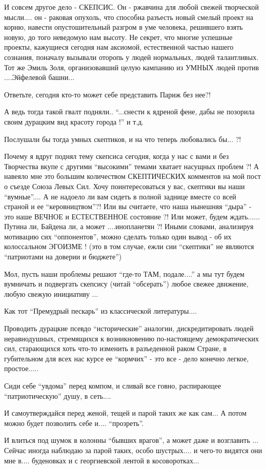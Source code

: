 И совсем другое дело - СКЕПСИС. Он - ржавчина для любой свежей творческой
мысли.... он - раковая опухоль, что способна разъесть новый смелый проект на
корню, навести опустошительный разгром в уме человека, решившего взять новую,
до того неведомую нам высоту. Не секрет, что многие успешные проекты, кажущиеся
сегодня нам аксиомой, естественной частью нашего сознания, поначалу вызывали
оторопь у людей нормальных, людей талантливых. Тот же Эмиль Золя,
организовавший целую кампанию из УМНЫХ людей против ....Эйфелевой башни... 

Ответьте, сегодня кто-то может себе представить Париж без нее?! 

А ведь тогда такой гвалт подняли.. \enquote{...снести к ядреной фене, дабы не позорила
своим дурацким вид красоту города !}
и т.д. 

Послушали бы тогда умных скептиков, и на что теперь любовались бы... ?!

Почему я вдруг поднял тему скепсиса сегодня, когда у нас с вами и без
Творчества вкупе с другими \enquote{высокими} темами хватает насущных проблем ?! А
навеяло мне это большим количеством СКЕПТИЧЕСКИХ комментов на мой пост о съезде
Союза Левых Сил. Хочу поинтересоваться у вас, скептики вы наши \enquote{вумные}.... А
не надоело ли вам сидеть в полной заднице вместе со всей страной и ее
\enquote{керовництвом}?! Или вы считаете, что наша нынешняя \enquote{дыра} - это наше ВЕЧНОЕ и
ЕСТЕСТВЕННОЕ состояние ?! Или может, будем ждать...... Путина ли, Байдена ли, а
может  ....инопланетян ?! Иными словами, анализируя мотивацию сих \enquote{оппонентов},
можно сделать только один вывод - об их колоссальном ЭГОИЗМЕ !   (это в том
случае, ежли сии \enquote{скептики} не являются \enquote{патриотами на доверии и бюджете})

Мол, пусть наши проблемы решают \enquote{где-то ТАМ, подале....} а мы тут будем
вумничать и подвергать скепсису (читай \enquote{обсерать}) любое свежее движение, любую
свежую инициативу ...

Как тот \enquote{Премудрый пескарь} из классической литературы....

Проводить дурацкие псевдо \enquote{исторические} аналогии, дискредитировать людей
неравнодушных, стремящихся к возникновению по-настоящему демократических сил,
старающихся хоть что-то изменить в разъеденной раком Стране, в губительном для
всех нас курсе ее \enquote{кормчих} - это все - дело конечно легкое, простое..... 

Сиди себе \enquote{увдома} перед компом, и сливай все говно, распирающее
\enquote{патриотическую} душу,  в сеть.... 

И самоутверждайся перед женой, тещей и парой таких же как сам... А потом можно
будет позволить себе и.... \enquote{прозреть}. 

И влиться под шумок в колонны \enquote{бывших врагов}, а может даже и возглавить ...
Сейчас иногда наблюдаю за парой таких, особо шустрых.... и чего-то видятся они
мне в.... буденовках и с георгиевской лентой в косоворотках...
